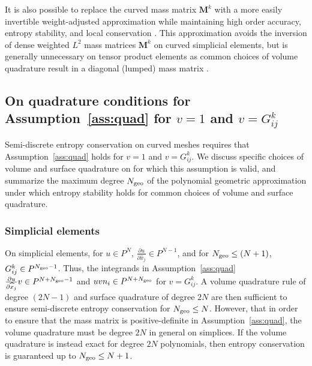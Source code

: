\documentclass{svjour3}                     %
\renewcommand{\hat}{\widehat}
\newcommand{\pd}[2]{\frac{\partial#1}{\partial#2}}
\renewcommand{\note}[1]{{\color{blue}{#1}}}
\begin{document}
\begin{remark}
It is also possible to replace the curved mass matrix $\bm{M}^k$ with a more easily invertible weight-adjusted approximation while maintaining high order accuracy, entropy stability, and local conservation \cite{chan2018discretely}.  This approximation avoids the inversion of dense weighted $L^2$ mass matrices $\bm{M}^k$ on curved simplicial elements, but is generally unnecessary on tensor product elements as common choices of volume quadrature result in a diagonal (lumped) mass matrix \cite{carpenter2014entropy, parsani2016entropy, chan2018efficient}.
\end{remark}

\subsection{On quadrature conditions for Assumption~\ref{ass:quad} for $v = 1$ and $v = G^k_{ij}$}

Semi-discrete entropy conservation on curved meshes requires that Assumption~\ref{ass:quad} holds for $v = 1$ and $v = G^k_{ij}$.  We discuss specific choices of volume and surface quadrature on for which this assumption is valid, and summarize the maximum degree $N_{\rm geo}$ of the polynomial geometric approximation under which entropy stability holds for common choices of volume and surface quadrature.  

\subsubsection{Simplicial elements} 

On simplicial elements, for $u \in P^N$, $\pd{u}{\hat{x}_j}\in P^{N-1}$, and for $N_{\rm geo}\leq (N+1)$, $G^k_{ij}\in P^{N_{\rm geo}-1}$.  Thus, the integrands in Assumption~\ref{ass:quad} $\pd{u}{\hat{x}_j} v \in P^{N+N_{\rm geo}-1}$ and $uv n_i \in P^{N+N_{\rm geo}}$ for $v = G^k_{ij}$.  A volume quadrature rule of degree $(2N-1)$ and surface quadrature of degree $2N$ are then sufficient to ensure semi-discrete entropy conservation for $N_{\rm geo}\leq N$.  However, that in order to ensure that the mass matrix is positive-definite in Assumption~\ref{ass:quad}, the volume quadrature must be degree $2N$ in general on simplices.  If the volume quadrature is instead exact for degree $2N$ polynomials, then entropy conservation is guaranteed up to $N_{\rm geo} \leq N+1$.  
\end{document}
